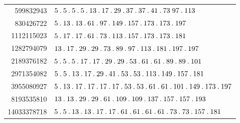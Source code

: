 \begin{longtable}{@{}r|l@{}}
599832943 & $5\pdot 5\pdot 5\pdot 5\pdot 13\pdot 17\pdot 29\pdot 37\pdot 37\pdot 41\pdot 73\;97\pdot 113$\\
830426722 & $5\pdot 13\pdot 13\pdot 61\pdot 97\pdot 149\pdot 157\pdot 173\pdot 173\pdot 197$\\
1112115023 & $5\pdot 17\pdot 17\pdot 61\pdot 73\pdot 113\pdot 157\pdot 173\pdot 173\pdot 181$\\
1282794079 & $13\pdot 17\pdot 29\pdot 29\pdot 73\pdot 89\pdot 97\pdot 113\pdot 181\pdot 197\pdot 197$\\
2189376182 & $5\pdot 5\pdot 5\pdot 17\pdot 17\pdot 29\pdot 29\pdot 53\pdot 61\pdot 61\pdot 89\pdot 89\pdot 101$\\
2971354082 & $5\pdot 5\pdot 13\pdot 17\pdot 29\pdot 41\pdot 53\pdot 53\pdot 113\pdot 149\pdot 157\pdot 181$\\
3955080927 & $5\pdot 13\pdot 17\pdot 17\pdot 17\pdot 17\pdot 53\pdot 53\pdot 61\pdot 61\pdot 101\pdot 149\pdot 173\pdot 197$\\
8193535810 & $13\pdot 13\pdot 29\pdot 29\pdot 61\pdot 109\pdot 109\pdot 137\pdot 157\pdot 157\pdot 193$\\
14033378718 & $5\pdot 5\pdot 13\pdot 13\pdot 17\pdot 17\pdot 61\pdot 61\pdot 61\pdot 61\pdot 73\pdot 73\pdot 157\pdot 181$\\
\end{longtable}\endgroup
\begingroup\small\setlength{\tabcolsep}{5pt}
